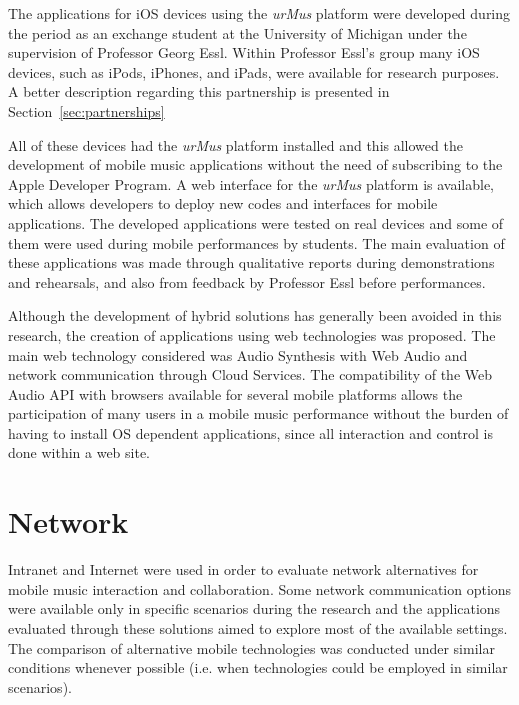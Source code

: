 The applications for iOS devices using the \textit{\textit{urMus}} platform were developed during the period as an exchange student at the University of Michigan under the supervision of Professor Georg Essl.
Within Professor Essl's group many iOS devices, such as iPods, iPhones, and iPads, were available for research purposes.
A better description regarding this partnership is presented in Section~\ref{sec:partnerships}

All of these devices had the \textit{urMus} platform installed and this allowed the development of mobile music applications without the need of subscribing to the Apple Developer Program.
A web interface for the \textit{urMus} platform  is available, which allows developers to deploy new codes and interfaces for mobile applications.
The developed applications were tested on real devices and some of them were used during mobile performances by students.
The main evaluation of these applications was made through qualitative reports during demonstrations and rehearsals, and also from feedback by Professor Essl before performances.

Although the development of hybrid solutions has generally been avoided in this research, the creation of applications using web technologies was proposed.
The main web technology considered was Audio Synthesis with Web Audio and network communication through Cloud Services.
The compatibility of the Web Audio API with browsers available for several mobile platforms allows the participation of many users in a mobile music performance without the burden of having to install OS dependent applications, since all interaction and control is done within a web site.




\section{Network}

Intranet and Internet were used in order to evaluate network alternatives for mobile music interaction and collaboration.
Some network communication options were available only in specific scenarios during the research and the applications evaluated through these solutions aimed to explore most of the available settings.
The comparison of alternative mobile technologies was conducted under similar conditions whenever possible (i.e. when technologies could be employed in similar scenarios).

